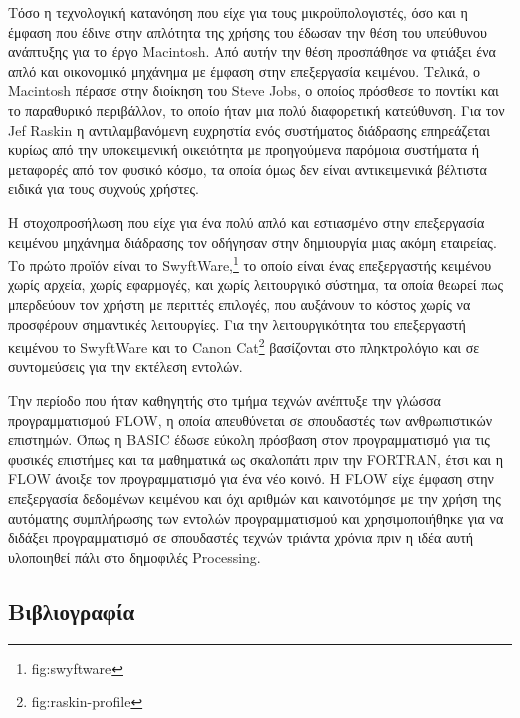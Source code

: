 \documentclass[
]{article}
\newlength{\cslhangindent}
\newlength{\cslentryspacingunit} %
\newenvironment{CSLReferences}[2] %
 {%
  \setlength{\parindent}{0pt}
  \ifodd #1
  \let\oldpar\par
  \def\par{\hangindent=\cslhangindent\oldpar}
  \fi
  \setlength{\parskip}{#2\cslentryspacingunit}
 }%
 {}
\begin{document}
Τόσο η τεχνολογική κατανόηση που είχε για τους μικροϋπολογιστές, όσο και
η έμφαση που έδινε στην απλότητα της χρήσης του έδωσαν την θέση του
υπεύθυνου ανάπτυξης για το έργο Macintosh. Από αυτήν την θέση προσπάθησε
να φτιάξει ένα απλό και οικονομικό μηχάνημα με έμφαση στην επεξεργασία
κειμένου. Τελικά, ο Macintosh πέρασε στην διοίκηση του Steve Jobs, ο
οποίος πρόσθεσε το ποντίκι και το παραθυρικό περιβάλλον, το οποίο ήταν
μια πολύ διαφορετική κατεύθυνση. Για τον Jef Raskin η αντιλαμβανόμενη
ευχρηστία ενός συστήματος διάδρασης επηρεάζεται κυρίως από την
υποκειμενική οικειότητα με προηγούμενα παρόμοια συστήματα ή μεταφορές
από τον φυσικό κόσμο, τα οποία όμως δεν είναι αντικειμενικά βέλτιστα
ειδικά για τους συχνούς χρήστες.

Η στοχοπροσήλωση που είχε για ένα πολύ απλό και εστιασμένο στην
επεξεργασία κειμένου μηχάνημα διάδρασης τον οδήγησαν στην δημιουργία
μιας ακόμη εταιρείας. Το πρώτο προϊόν είναι το SwyftWare,\footnote{fig:swyftware}
το οποίο είναι ένας επεξεργαστής κειμένου χωρίς αρχεία, χωρίς εφαρμογές,
και χωρίς λειτουργικό σύστημα, τα οποία θεωρεί πως μπερδεύουν τον χρήστη
με περιττές επιλογές, που αυξάνουν το κόστος χωρίς να προσφέρουν
σημαντικές λειτουργίες. Για την λειτουργικότητα του επεξεργαστή κειμένου
το SwyftWare και το Canon Cat\footnote{fig:raskin-profile} βασίζονται
στο πληκτρολόγιο και σε συντομεύσεις για την εκτέλεση εντολών.

Την περίοδο που ήταν καθηγητής στο τμήμα τεχνών ανέπτυξε την γλώσσα
προγραμματισμού FLOW, η οποία απευθύνεται σε σπουδαστές των
ανθρωπιστικών επιστημών. Όπως η BASIC έδωσε εύκολη πρόσβαση στον
προγραμματισμό για τις φυσικές επιστήμες και τα μαθηματικά ως σκαλοπάτι
πριν την FORTRAN, έτσι και η FLOW άνοιξε τον προγραμματισμό για ένα νέο
κοινό. Η FLOW είχε έμφαση στην επεξεργασία δεδομένων κειμένου και όχι
αριθμών και καινοτόμησε με την χρήση της αυτόματης συμπλήρωσης των
εντολών προγραμματισμού και χρησιμοποιήθηκε για να διδάξει
προγραμματισμό σε σπουδαστές τεχνών τριάντα χρόνια πριν η ιδέα αυτή
υλοποιηθεί πάλι στο δημοφιλές Processing.

\hypertarget{ux3b2ux3b9ux3b2ux3bbux3b9ux3bfux3b3ux3c1ux3b1ux3c6ux3afux3b1}{%
\subsection*{Βιβλιογραφία}\label{ux3b2ux3b9ux3b2ux3bbux3b9ux3bfux3b3ux3c1ux3b1ux3c6ux3afux3b1}}

\hypertarget{refs}{}
\begin{CSLReferences}{0}{0}
\end{CSLReferences}
\end{document}
